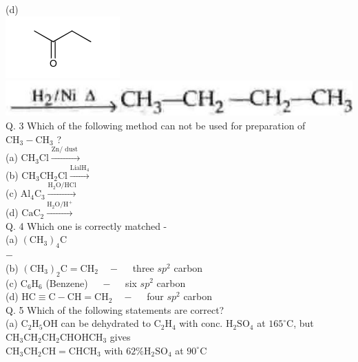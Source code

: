 \documentclass[10pt]{article}
\begin{document}
(d)\\
\includegraphics{smile-a2f8ab6442484254f3a19e5fa66335c91c1a5ed3}\\
\includegraphics[max width=\textwidth, center]{2025_01_28_8470952b98110cec3aabg-235(2)}\\
Q. 3 Which of the following method can not be used for preparation of $\mathrm{CH}_{3}-\mathrm{CH}_{3}$ ?\\
(a) $\mathrm{CH}_{3} \mathrm{Cl} \xrightarrow{\mathrm{Zn} / \text { dust }}$\\
(b) $\mathrm{CH}_{3} \mathrm{CH}_{2} \mathrm{Cl} \xrightarrow{\mathrm{LialH}_{4}}$\\
(c) $\mathrm{Al}_{4} \mathrm{C}_{3} \xrightarrow{\mathrm{H}_{2} \mathrm{O} / \mathrm{HCl}}$\\
(d) $\mathrm{CaC}_{2} \xrightarrow{\mathrm{H}_{2} \mathrm{O} / \mathrm{H}^{+}}$\\
Q. 4 Which one is correctly matched -\\
(a) $\left(\mathrm{CH}_{3}\right)_{4} \mathrm{C}$\\
$-\quad$\\
(b) $\left(\mathrm{CH}_{3}\right)_{2} \mathrm{C}=\mathrm{CH}_{2} \quad-\quad$ three $s p^{2}$ carbon\\
(c) $\mathrm{C}_{6} \mathrm{H}_{6}$ (Benzene) $\quad-\quad$ six $s p^{2}$ carbon\\
(d) $\mathrm{HC} \equiv \mathrm{C}-\mathrm{CH}=\mathrm{CH}_{2} \quad-\quad$ four $s p^{2}$ carbon\\
Q. 5 Which of the following statements are correct?\\
(a) $\mathrm{C}_{2} \mathrm{H}_{5} \mathrm{OH}$ can be dehydrated to $\mathrm{C}_{2} \mathrm{H}_{4}$ with conc. $\mathrm{H}_{2} \mathrm{SO}_{4}$ at $165^{\circ} \mathrm{C}$, but $\mathrm{CH}_{3} \mathrm{CH}_{2} \mathrm{CH}_{2} \mathrm{CHOHCH}_{3}$ gives\\
$\mathrm{CH}_{3} \mathrm{CH}_{2} \mathrm{CH}=\mathrm{CHCH}_{3}$ with $62 \% \mathrm{H}_{2} \mathrm{SO}_{4}$ at $90^{\circ} \mathrm{C}$\\
\end{document}
